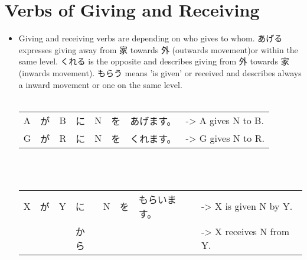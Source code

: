 \documentclass{article}
\begin{document}
\section{Verbs of Giving and Receiving}
\begin{itemize}
\item Giving and receiving verbs are depending on who gives to whom. あげる expresses giving away from 家 towards 外 (outwards movement)or within the same level. くれる is the opposite and describes giving from 外 towards 家 (inwards movement). もらう means 'is given' or received and describes always a inward movement or one on the same level.\\
\vspace{2 mm} \\
\begin{tabular}{ l l l l l l l | l }
A&が&B&に&N&を&あげます。&-> A gives N to B. \\
G&が&R&に&N&を&くれます。&-> G gives N to R. \\
\end{tabular} \\
\vspace{2 mm} \\
\begin{tabular}{ l l l l l l l | l }
X&が&Y&に&N&を&もらいます。&-> X is given N by Y.\\
&&&から&&&&-> X receives N from Y. \\ 
\end{tabular}
\end{itemize}
\end{document}
